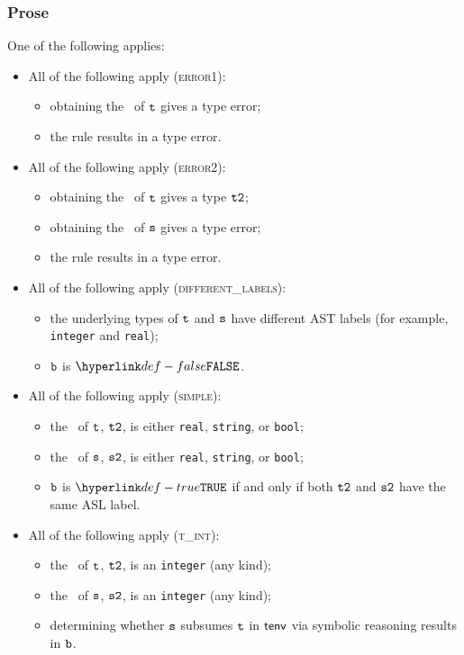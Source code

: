 \subsubsection{Prose}
One of the following applies:
\begin{itemize}
\item All of the following apply (\textsc{error1}):
  \begin{itemize}
  \item obtaining the \underlyingtype\ of $\texttt{t}$ gives a type error;
  \item the rule results in a type error.
  \end{itemize}

\item All of the following apply (\textsc{error2}):
  \begin{itemize}
    \item obtaining the \underlyingtype\ of $\texttt{t}$ gives a type $\texttt{t2}$;
    \item obtaining the \underlyingtype\ of $\texttt{s}$ gives a type error;
    \item the rule results in a type error.
    \end{itemize}

\item All of the following apply (\textsc{different\_labels}):
  \begin{itemize}
  \item the underlying types of $\texttt{t}$ and $\texttt{s}$ have different AST labels
  (for example, \texttt{integer} and \texttt{real});
  \item $\texttt{b}$ is $\False$.
  \end{itemize}

\item All of the following apply (\textsc{simple}):
  \begin{itemize}
  \item the \underlyingtype\ of $\texttt{t}$, $\texttt{t2}$, is either \texttt{real}, \texttt{string}, or \texttt{bool};
  \item the \underlyingtype\ of $\texttt{s}$, $\texttt{s2}$, is either \texttt{real}, \texttt{string}, or \texttt{bool};
  \item $\texttt{b}$ is $\True$ if and only if both $\texttt{t2}$ and $\texttt{s2}$ have the same ASL label.
  \end{itemize}

\item All of the following apply (\textsc{t\_int}):
  \begin{itemize}
  \item the \underlyingtype\ of $\texttt{t}$, $\texttt{t2}$, is an \texttt{integer} (any kind);
  \item the \underlyingtype\ of $\texttt{s}$, $\texttt{s2}$, is an \texttt{integer} (any kind);
  \item determining whether $\texttt{s}$ subsumes $\texttt{t}$ in $\textsf{tenv}$ via symbolic reasoning results in $\texttt{b}$.
  \end{itemize}


\end{itemize}
